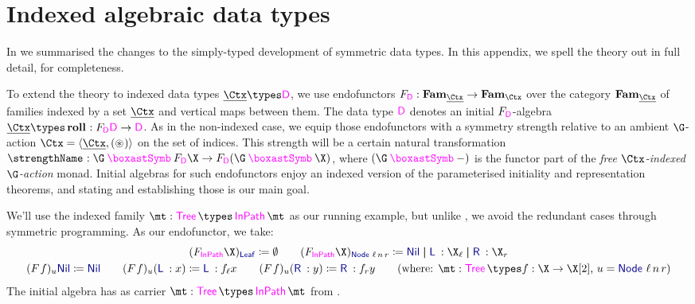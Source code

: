 \section{Indexed algebraic data types}

In  we summarised the changes to the
simply-typed development of symmetric data types. In this appendix, we
spell the theory out in full detail, for completeness.

To extend the theory to indexed data types $\carrier\Ctx \types
\TConst D$, we use endofunctors $\struct[\TConst D] :
\Fam_{\carrier\Ctx} \to \Fam_{\Ctx}$ over the category
$\Fam_{\carrier\Ctx}$ of families indexed by a set $\carrier\Ctx$ and
vertical maps between them. The data type $\TConst D$ denotes an
initial $\struct[\TConst D]$-algebra $\carrier\Ctx \types \roll :
\struct[\TConst D] \TConst D \to \TConst D$. As in the non-indexed
case, we equip those endofunctors with a symmetry strength relative to
an ambient $\G$-action $\Ctx = \pair{\carrier\Ctx}{(\act)}$ on the set
of indices. This strength will be a certain natural transformation
$\strength : \gast \struct[\TConst D] \X \to \struct[\TConst D](\gast
\X)$, where $(\gast-)$ is the functor part of the \emph{free
$\Ctx$-indexed $\G$-action} monad.  Initial algebras for such
endofunctors enjoy an indexed version of the parameterised initiality
and representation theorems, and stating and establishing those is our
main goal.

We'll use the indexed family $\mt : \Tree \types \NodeIn \mt$ as our
running example, but unlike , we avoid the
redundant cases through symmetric programming. As our endofunctor, we
take:
\begin{gather*}
(\struct[\NodeIn]\X)_{\Leaf} \definedby \emptyset
\qquad
(\struct[\NodeIn]\X)_{\Node\,\ell\, n\,r} \definedby
  \Nil \Or \Lft\:: \X_{\ell} \Or \Rgt\:: \X_{r}
\\
(\fmap f)_{u}\Nil \definedby \Nil
\qquad
(\fmap f)_{u}(\Lft\:: x) \definedby \Lft\:: f_{\ell}x
\qquad
(\fmap f)_{u}(\Rgt\:: y) \definedby \Rgt\:: f_{r}y
\tag{where: $\mt : \Tree \types f : \X \to \Y$, $u = \Node\, \ell\, n\, r$}
\end{gather*}
The initial algebra has as carrier $\mt :
\Tree \types \NodeIn\mt$ from .

